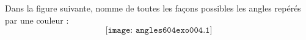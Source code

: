 Dans la figure suivante, nomme de toutes les façons possibles les angles repérés par une couleur :
\[\texttt{[image: angles604exo004.1]}\]
